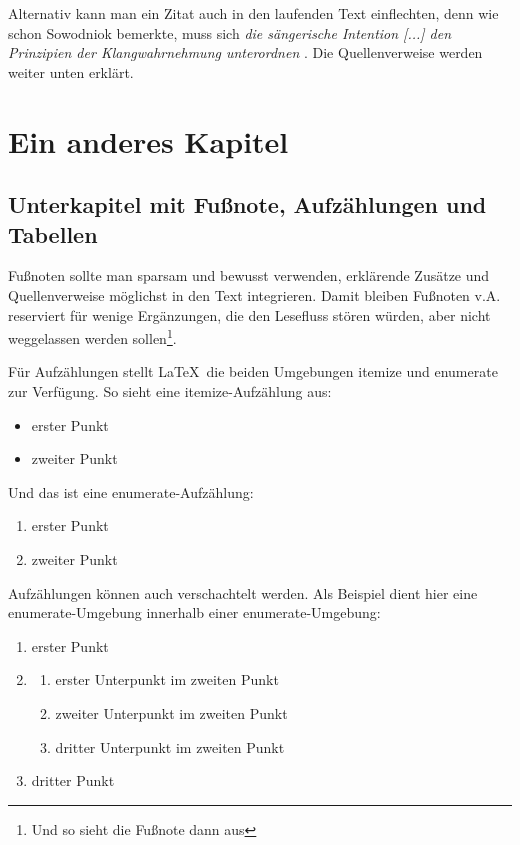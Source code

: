 Alternativ kann man ein Zitat auch in den laufenden Text einflechten, denn wie schon Sowodniok bemerkte, muss sich 
\emph{\glqq die sängerische Intention [...] den Prinzipien der Klangwahrnehmung unterordnen\grqq} \citep[111]{sowodniok}. 
Die Quellenverweise werden weiter unten erklärt.


\chapter{Ein anderes Kapitel}

\section{Unterkapitel mit Fußnote, Aufzählungen und Tabellen}\label{sec_fussnot}

Fußnoten sollte man sparsam und bewusst verwenden, erklärende Zusätze und Quellenverweise möglichst in den Text integrieren. Damit bleiben Fußnoten v.A. reserviert für wenige Ergänzungen, die den Lesefluss stören würden, aber nicht weggelassen werden sollen\footnote{Und so sieht die Fußnote dann aus}.

Für Aufzählungen stellt \LaTeX\ die beiden Umgebungen itemize und enumerate zur Verfügung. So sieht eine itemize-Aufzählung aus:

\begin{itemize}\setlength{\itemsep}{0ex} %
\item erster Punkt
\item zweiter Punkt
\end{itemize}

Und das ist eine enumerate-Aufzählung:

\begin{enumerate}\setlength{\itemsep}{0ex}
\item erster Punkt
\item zweiter Punkt
\end{enumerate}

Aufzählungen können auch verschachtelt werden. Als Beispiel dient hier eine enumerate-Umgebung innerhalb einer enumerate-Umgebung:

\begin{enumerate}\setlength{\itemsep}{0ex}
\item erster Punkt
\item 
	\begin{enumerate}\setlength{\itemsep}{-0.5ex}
	\item erster Unterpunkt im zweiten Punkt
	\item zweiter Unterpunkt im zweiten Punkt
	\item dritter Unterpunkt im zweiten Punkt
	\end{enumerate}
\item dritter Punkt
\end{enumerate}

